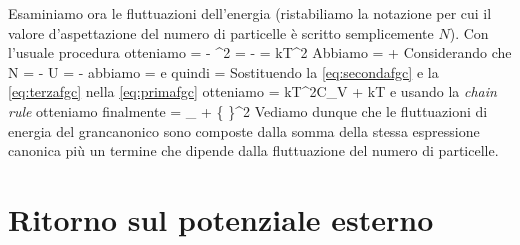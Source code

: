 Esaminiamo ora le fluttuazioni dell'energia (ristabiliamo la notazione per cui il valore d'aspettazione del numero di particelle è scritto semplicemente $N$). Con l'usuale procedura otteniamo
\be
\label{eq:primafgc}
 =  - ^2 = - = kT^2
\ee
Abbiamo
\be
\label{eq:secondafgc}
 =  + 
\ee
Considerando che
\be
N = - \quad\quad\quad U = -
\ee
abbiamo
\be
{} = 
\ee
e quindi
\be
\label{eq:terzafgc}
 = 
\ee
Sostituendo la \ref{eq:secondafgc} e la \ref{eq:terzafgc} nella \ref{eq:primafgc} otteniamo
\be
{} = kT^2C_V + kT
\ee
e usando la {\em chain rule} otteniamo finalmente
\be
{} = _{} + 
\left\{
\right\}^2 
\ee
Vediamo dunque che le fluttuazioni di energia del grancanonico sono composte dalla somma della stessa espressione canonica più un termine che dipende dalla fluttuazione del numero di particelle.	

\section{Ritorno sul potenziale esterno}
\label{sec:05-potesternoGC}

